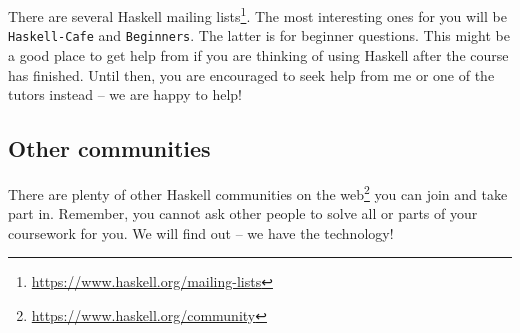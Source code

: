 There are several Haskell mailing lists\footnote{\url{https://www.haskell.org/mailing-lists}}. The most interesting ones for you will be \texttt{\small Haskell-Cafe} and \texttt{\small Beginners}. The latter is for beginner questions. This might be a good place to get help from if you are thinking of using Haskell after the course has finished. Until then, you are encouraged to seek help from me or one of the tutors instead -- we are happy to help! 

\subsection{Other communities} 

There are plenty of other Haskell communities on the web\footnote{\url{https://www.haskell.org/community}} you can join and take part in. Remember, you cannot ask other people to solve all or parts of your coursework for you. We will find out -- we have the technology!


